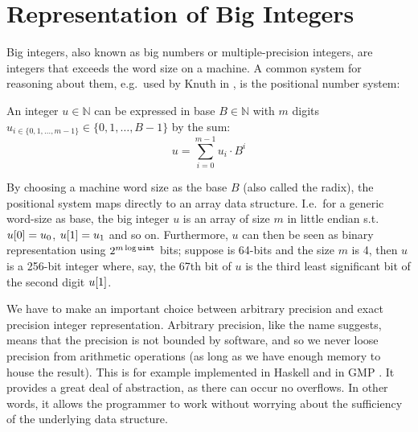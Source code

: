 \section{Representation of Big Integers}
\label{sec:big}
Big integers, also known as big numbers or multiple-precision integers, are
integers that exceeds the word size on a machine. A common system for reasoning
about them, e.g.\ used by Knuth in \cite{knuth97}, is the positional number
system:

\begin{definition}\label{def:bigints}
  An integer $u \in \mathbb{N}$ can be expressed in base $B \in \mathbb{N}$ with
  $m$ digits $u_{i\in \{0,1,\ldots,m-1\}}\in\{0,1,\ldots,B-1\}$ by the sum:
  \begin{equation}
\label{eq:rep}
u = \sum_{i=0}^{m-1}u_i\cdot B^{i}
\end{equation}
\end{definition}

By choosing a machine word size as the base $B$ (also called the radix), the
positional system maps directly to an array data structure. I.e.\ for a generic
word-size \uint{} as base, the big integer $u$ is an array of size $m$ in little
endian s.t.\ $u\mathtt{[}0\mathtt{]} = u_0$, $u\mathtt{[}1\mathtt{]} = u_1$ and so on. Furthermore,
$u$ can then be seen as binary representation using $2^{m\log \texttt{uint}{}}$ bits;
suppose \uint{} is 64-bits and the size $m$ is 4, then $u$ is a 256-bit integer
where, say, the 67th bit of $u$ is the third least significant bit of the second
digit $u\mathtt{[}1\mathtt{]}$.


We have to make an important choice between arbitrary precision and exact
precision integer representation. Arbitrary precision, like the name suggests,
means that the precision is not bounded by software, and so we never loose
precision from arithmetic operations (as long as we have enough memory to house
the result). This is for example implemented in Haskell and in GMP
\cite{marlow2010haskell,GMP}. It provides a great deal of abstraction, as there
can occur no overflows. In other words, it allows the programmer to work without
worrying about the sufficiency of the underlying data structure.

